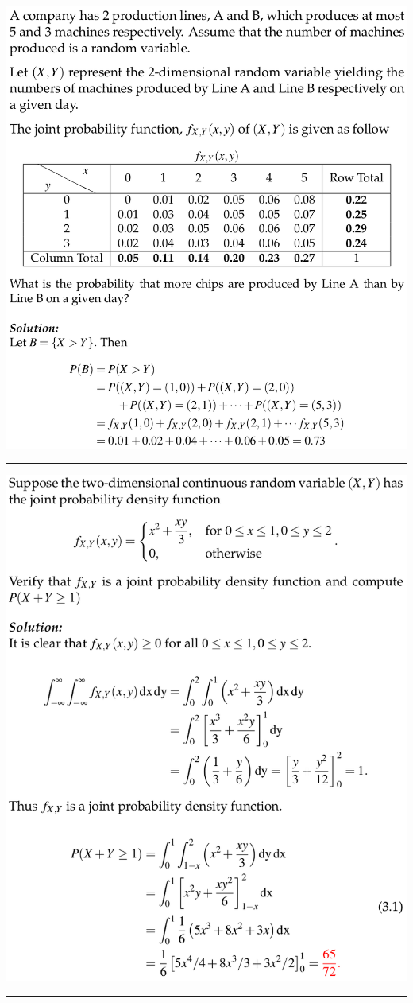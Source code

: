 \documentclass[a4paper, 12pt]{article}
\begin{document}
\begin{multicols*}{3}
\includegraphics[scale=0.25]{jpmf-find-p.png}
\noindent\rule{\columnwidth}{0.5pt}
\includegraphics[scale=0.26]{jpdf-find-p.png}
\noindent\rule{\columnwidth}{0.5pt}

\end{multicols*}
\end{document}
